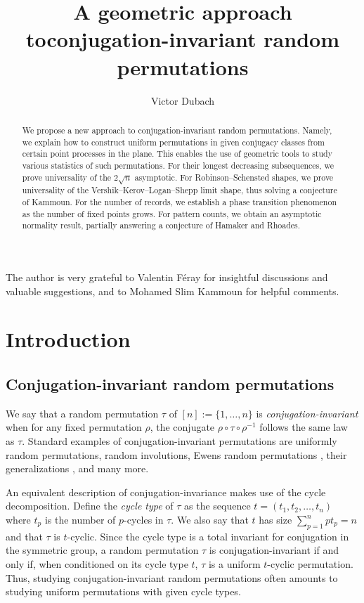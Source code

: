 \documentclass{article}
\title{A geometric approach to\linebreak conjugation-invariant random permutations}
\author{Victor Dubach}
\date{}
\theoremstyle{remark}
\begin{document}
\maketitle

\begin{abstract}
    We propose a new approach to conjugation-invariant random permutations.
    Namely, we explain how to construct uniform permutations in given conjugacy classes from certain point processes in the plane.
    This enables the use of geometric tools to study various statistics of such permutations.
    For their longest decreasing subsequences, we prove universality of the $2\sqrt n$ asymptotic.
    For Robinson--Schensted shapes, we prove universality of the Vershik--Kerov--Logan--Shepp limit shape, thus solving a conjecture of Kammoun.
    For the number of records, we establish a phase transition phenomenon as the number of fixed points grows.
    For pattern counts, we obtain an asymptotic normality result, partially answering a conjecture of Hamaker and Rhoades.
\end{abstract}

 The author is very grateful to Valentin F\'eray for insightful discussions and valuable suggestions, and to Mohamed Slim Kammoun for helpful comments.

\section{Introduction}

\subsection{Conjugation-invariant random permutations}

We say that a random permutation $\tau$ of $[n] := \{1,\dots,n\}$ is {\em conjugation-invariant} when for any fixed permutation $\rho$, the conjugate $\rho\circ\tau\circ\rho^{-1}$ follows the same law as $\tau$.
Standard examples of conjugation-invariant permutations are uniformly random permutations, random involutions, Ewens random permutations \cite{E72}, their generalizations \cite{BUV11,K78,T00}, and many more.

An equivalent description of conjugation-invariance makes use of the cycle decomposition.
Define the {\em cycle type} of $\tau$ as the sequence $t=(t_1,t_2,\dots,t_n)$ where $t_p$ is the number of $p$-cycles in $\tau$.
We also say that $t$ has size $\sum_{p=1}^n pt_p = n$ and that $\tau$ is $t$-cyclic.
Since the cycle type is a total invariant for conjugation in the symmetric group, a random permutation $\tau$ is conjugation-invariant if and only if, when conditioned on its cycle type $t$, $\tau$ is a uniform $t$-cyclic permutation.
Thus, studying conjugation-invariant random permutations often amounts to studying uniform permutations with given cycle types.
\end{document}

